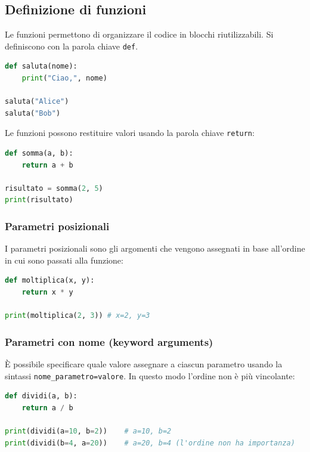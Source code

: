 \subsection{Definizione di funzioni}
\label{sec:funzioni}

Le funzioni permettono di organizzare il codice in blocchi riutilizzabili. Si definiscono con la parola chiave \texttt{def}.

\begin{lstlisting}[language = python, frame = none]
def saluta(nome):
    print("Ciao,", nome)

saluta("Alice")
saluta("Bob")
\end{lstlisting}

Le funzioni possono restituire valori usando la parola chiave \texttt{return}:

\begin{lstlisting}[language = python, frame = none]
def somma(a, b):
    return a + b

risultato = somma(2, 5)
print(risultato)
\end{lstlisting}

\subsubsection{Parametri posizionali}
I parametri posizionali sono gli argomenti che vengono assegnati in base all’ordine in cui sono passati alla funzione:

\begin{lstlisting}[language = python, frame = none]
def moltiplica(x, y):
    return x * y

print(moltiplica(2, 3)) # x=2, y=3
\end{lstlisting}

\subsubsection{Parametri con nome (keyword arguments)}
È possibile specificare quale valore assegnare a ciascun parametro usando la sintassi \texttt{nome\_parametro=valore}. In questo modo l’ordine non è più vincolante:

\begin{lstlisting}[language = python, frame = none]
def dividi(a, b):
    return a / b

print(dividi(a=10, b=2))    # a=10, b=2
print(dividi(b=4, a=20))    # a=20, b=4 (l'ordine non ha importanza)
\end{lstlisting}

